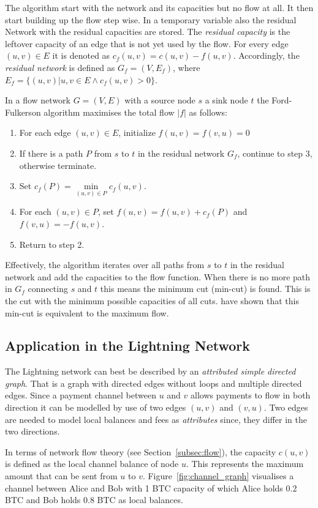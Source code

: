\documentclass[final]{fhnwreport}       %
\begin{document}
The algorithm start with the network and its capacities but no flow at all. It then start building up the flow step wise. In a temporary variable also the residual Network with the residual capacities are stored. The \emph{residual capacity} is the leftover capacity of an edge that is not yet used by the flow. For every edge $(u,v) \in E$ it is denoted as $c_f(u,v) = c(u,v)-f(u,v)$. Accordingly, the \emph{residual network} is defined as $G_f = (V, E_f)$, where $E_f=\{(u,v) | u, v \in  E \land c_f(u,v)>0\}$.

In a flow network $G = (V, E)$ with a source node $s$ a sink node $t$ the Ford-Fulkerson algorithm maximises the total flow $|f|$ as follows:

\begin{enumerate}
  \item For each edge $(u,v) \in E$, initialize $f(u, v)=f(v, u) = 0$
  \item If there is a path $P$ from $s$ to $t$ in the residual network $G_f$, continue to step 3, otherwise terminate.
  \item Set $c_f(P) = \min\limits_{(u,v) \in P} c_f(u, v)$.
  \item For each $(u,v) \in P$, set $f(u,v) = f(u, v) + c_f(P)$ and $f(v,u) = -f(u,v)$.
  \item Return to step 2.
\end{enumerate}

Effectively, the algorithm iterates over all paths from $s$ to $t$ in the residual network and add the capacities to the flow function. When there is no more path in $G_f$ connecting $s$ and $t$ this means the minimum cut (min-cut) is found. This is the cut with the minimum possible capacities of all cuts. \textcite{ford_maximal_1956} have shown that this min-cut is equivalent to the maximum flow. 

\subsection{Application in the Lightning Network}
The Lightning network can best be described by an \emph{attributed simple directed graph}. That is a graph with directed edges without loops and multiple directed edges. Since a payment channel between $u$ and $v$ allows payments to flow in both direction it can be modelled by use of two edges $(u, v)$ and $(v, u)$. Two edges are needed to model local balances and fees as \emph{attributes} since, they differ in the two directions.

In terms of network flow theory (see Section~\ref{subsec:flow}), the capacity $c(u,v)$ is defined as the local channel balance of node $u$. This represents the maximum amount that can be sent from $u$ to $v$. Figure~\ref{fig:channel_graph} visualises a channel between Alice and Bob with 1 BTC capacity of which Alice holds 0.2 BTC and Bob holds 0.8 BTC as local balances. 
\end{document}
